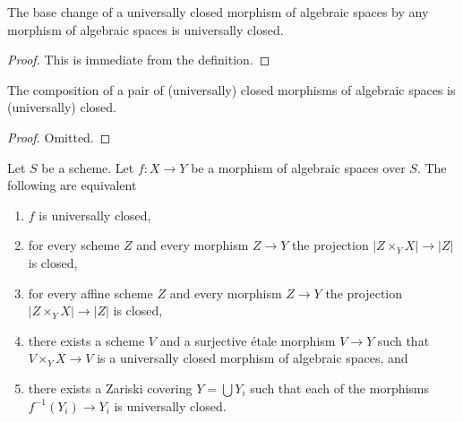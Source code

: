 \begin{lemma}
\label{lemma-base-change-universally-closed}
The base change of a universally closed morphism of algebraic spaces
by any morphism of algebraic spaces is universally closed.
\end{lemma}

\begin{proof}
This is immediate from the definition.
\end{proof}

\begin{lemma}
\label{lemma-composition-universally-closed}
The composition of a pair of (universally) closed morphisms of algebraic spaces
is (universally) closed.
\end{lemma}

\begin{proof}
Omitted.
\end{proof}

\begin{lemma}
\label{lemma-universally-closed-local}
Let $S$ be a scheme. Let $f : X \to Y$ be a morphism of algebraic spaces
over $S$. The following are equivalent
\begin{enumerate}
\item $f$ is universally closed,
\item for every scheme $Z$ and every morphism $Z \to Y$
the projection $|Z \times_Y X| \to |Z|$ is closed,
\item for every affine scheme $Z$ and every morphism $Z \to Y$
the projection $|Z \times_Y X| \to |Z|$ is closed,
\item there exists a scheme $V$ and a surjective \'etale morphism
$V \to Y$ such that $V \times_Y X \to V$ is a universally closed morphism
of algebraic spaces, and
\item there exists a Zariski covering $Y = \bigcup Y_i$ such that
each of the morphisms $f^{-1}(Y_i) \to Y_i$ is universally closed.
\end{enumerate}
\end{lemma}

